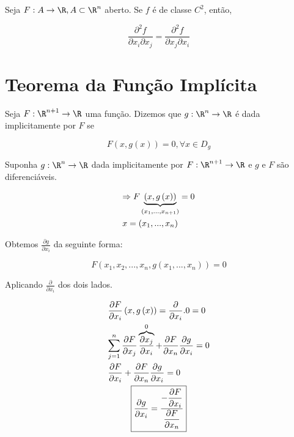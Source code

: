 \documentclass[11pt, oneside, a4paper]{gsm-l}
\begin{document}
\begin{teo}[de Schwarz] \label{t5}
    Seja $F: A \to \R,A \subset \R^n$ aberto. Se $f$ é de classe $C^2$, então,

\[
\frac{{\partial ^2 f}}
{{\partial x_i \partial x_j }} = \frac{{\partial ^2 f}}
{{\partial x_j \partial x_i }}
\]

\end{teo}

\section{Teorema da Função Implícita} \label{sec17}

\begin{defi}
Seja $F:\R^{n + 1}  \to \R$ uma função. Dizemos que $g:\R^n  \to \R$ é dada implicitamente por $F$ se

\[
F\left( {x,g\left( x \right)} \right) = 0,\forall x \in D_g
\]
\end{defi}

Suponha $g:\R^n  \to \R$ dada implicitamente por $F:\R^{n + 1}  \to \R$ e $g$ e $F$ são diferenciáveis.

\[
\begin{gathered}
   \Rightarrow F\underbrace {\left( {x,g\left( x \right)} \right)}_{\left( {x_1 ,...,x_{n + 1} } \right)} = 0 \hfill \\
x = \left( {x_1 ,...,x_n } \right) \hfill \\
\end{gathered}
\]

Obtemos $\frac{{\partial g}}{{\partial x_i }}$ da seguinte forma:

\[
F\left( {x_1 ,x_2 ,...,x_n ,g\left( {x_1 ,...,x_n } \right)} \right) = 0
\]

Aplicando $\frac{\partial}{{\partial x_i }}$ dos dois lados.

\[
\begin{gathered}
\frac{{\partial F}}
{{\partial x_i }}\left( {x,g\left( x \right)} \right) = \frac{\partial }
{{\partial x_i }}.0 = 0 \hfill \\
\sum\limits_{j = 1}^n {\frac{{\partial F}}
{{\partial x_j }}\overbrace {\frac{{\partial x_j }}
{{\partial x_i }}}^0 + \frac{{\partial F}}
{{\partial x_n }}\frac{{\partial g}}
{{\partial x_i }}}  = 0 \hfill \\
\frac{{\partial F}}
{{\partial x_i }} + \frac{{\partial F}}
{{\partial x_n }}\frac{{\partial g}}
{{\partial x_i }} = 0 \hfill \\
\boxed{\displaystyle \frac{{\partial g}}
{{\partial x_i }} = \displaystyle \frac{{\displaystyle - \frac{{\partial F}}
{{\partial x_i }}}}
{{\displaystyle \frac{{\partial F}}
{{\partial x_n }}}} \hfill} \\
\end{gathered}
\]
\end{document}
